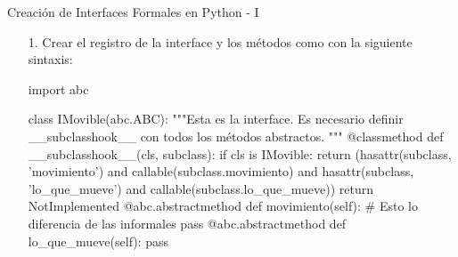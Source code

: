 \documentclass[10pt, envcountsect , spanish]{beamer}
\begin{document}
\begin{frame}[fragile]{Creación de Interfaces Formales en Python - I} 

\begin{enumerate}

\item[1.] \small Crear el registro de la interface y  los métodos como  con la siguiente sintaxis:

\footnotesize
\begin{pyconsole}[][frame=single, fontsize=\scriptsize]
import abc

class IMovible(abc.ABC):
    """Esta es la interface.
    Es necesario definir __subclasshook__ con todos los métodos abstractos.
    """
    @classmethod
    def __subclasshook__(cls, subclass):
        if cls is IMovible:
            return (hasattr(subclass, 'movimiento') and
                    callable(subclass.movimiento) and
                    hasattr(subclass, 'lo_que_mueve') and
                    callable(subclass.lo_que_mueve))
        return NotImplemented   
    @abc.abstractmethod
    def movimiento(self):  # Esto lo diferencia de las informales
        pass  
    @abc.abstractmethod
    def lo_que_mueve(self):
        pass
        
\end{pyconsole}

\end{enumerate}

\end{frame}
\end{document}
